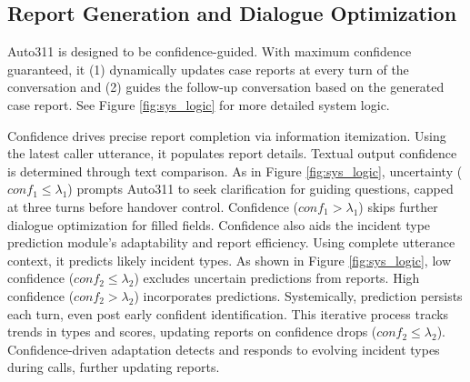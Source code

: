 
\subsection{Report Generation and Dialogue Optimization}

Auto311 is designed to be confidence-guided. With maximum confidence guaranteed, it (1) dynamically updates case reports at every turn of the conversation and (2) guides the follow-up conversation based on the generated case report. See Figure \ref{fig:sys_logic} for more detailed system logic. 

Confidence drives precise report completion via information itemization. Using the latest caller utterance, it populates report details. Textual output confidence is determined through text comparison. As in Figure \ref{fig:sys_logic}, uncertainty ($conf_1 \leq \lambda_1$) prompts Auto311 to seek clarification for guiding questions, capped at three turns before handover control. Confidence ($conf_1 > \lambda_1$) skips further dialogue optimization for filled fields. Confidence also aids the incident type prediction module's adaptability and report efficiency. Using complete utterance context, it predicts likely incident types. As shown in Figure \ref{fig:sys_logic}, low confidence ($conf_2 \leq \lambda_2$) excludes uncertain predictions from reports. High confidence ($conf_2 > \lambda_2$) incorporates predictions. Systemically, prediction persists each turn, even post early confident identification. This iterative process tracks trends in types and scores, updating reports on confidence drops ($conf_2 \leq \lambda_2$). Confidence-driven adaptation detects and responds to evolving incident types during calls, further updating reports.

